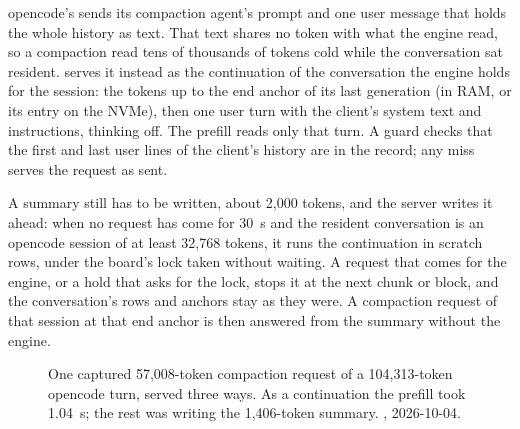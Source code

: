opencode's  sends its compaction agent's prompt and one user message that holds the whole history as text. That text shares no token with what the engine read, so a compaction read tens of thousands of tokens cold while the conversation sat resident.  serves it instead as the continuation of the conversation the engine holds for the session: the tokens up to the end anchor of its last generation (in RAM, or its entry on the NVMe), then one user turn with the client's system text and instructions, thinking off. The prefill reads only that turn. A guard checks that the first and last user lines of the client's history are in the record; any miss serves the request as sent.

A summary still has to be written, about 2,000 tokens, and the server writes it ahead: when no request has come for 30~s and the resident conversation is an opencode session of at least 32,768 tokens, it runs the continuation in scratch rows, under the board's lock taken without waiting. A request that comes for the engine, or a hold that asks for the lock, stops it at the next chunk or block, and the conversation's rows and anchors stay as they were. A compaction request of that session at that end anchor is then answered from the summary without the engine.

\begin{figure}[htbp]
\centering
{}
\caption[One compaction three ways]{One captured 57,008-token compaction request of a 104,313-token opencode turn, served three ways. As a continuation the prefill took 1.04~s; the rest was writing the 1,406-token summary. \measured, 2026-10-04.}\label{fig:compaction}
\end{figure}


